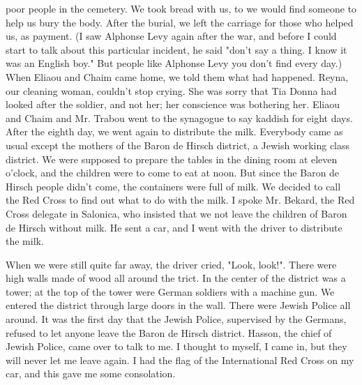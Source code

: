 poor people in the cemetery. We took bread with us, to 
we would find someone to help us bury the body. After the burial, 
we left the carriage for those who helped us, as payment. 
(I saw Alphonse Levy again after the war, and before I could 
start to talk about this particular incident, he said "don't say 
a thing. I know it was an English boy." But people like Alphonse Levy 
you don't find every day.) 
When Eliaou and Chaim came home, we told them what had happened. 
Reyna, our cleaning woman, couldn't stop crying. She was sorry that 
Tia Donna had looked after the soldier, and not her; her conscience was 
bothering her. Eliaou and Chaim and Mr. Trabou went to the synagogue 
to say kaddish for eight days. After the eighth day, we went again to 
distribute the milk. Everybody came as usual except the mothers of 
the Baron de Hirsch district, a Jewish working class district. We were 
supposed to prepare the tables in the dining room at eleven o'clock, 
and the children were to come to eat at noon. But since the Baron de 
Hirsch people didn't come, the containers were full of milk. We decided 
to call the Red Cross to find out what to do with the milk. I spoke 
Mr. Bekard, the Red Cross delegate in Salonica, who insisted that we 
not leave the children of Baron de Hirsch without milk. He sent a car, 
and I went with the driver to distribute the milk. 

When we were still quite far away, the driver cried, 
"Look, look!". There were high walls made of wood all around the 
trict. In the center of the district was a tower; at the top of the 
tower were German soldiers with a machine gun. We entered the district through large doors in the wall. There were Jewish Police all around. It was the first day that the Jewish Police, supervised by the Germans, refused to let anyone leave the Baron de Hirsch district. 
Hasson, the chief of Jewish Police, came over to talk to me. I thought 
to myself, I came in, but they will never let me leave again. I had the 
flag of the International Red Cross on my car, and this gave me some consolation. 

